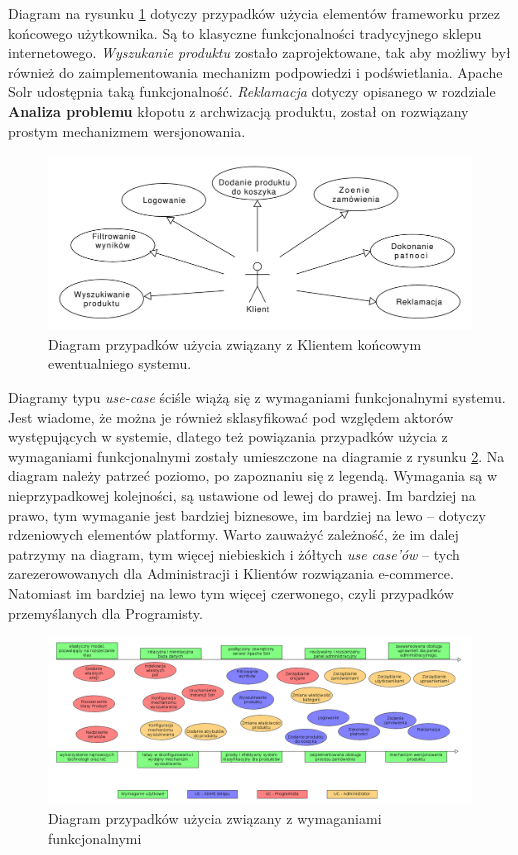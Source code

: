 Diagram na rysunku \ref{useCaseCustomer} dotyczy przypadków użycia elementów frameworku przez końcowego użytkownika. Są to klasyczne funkcjonalności tradycyjnego sklepu internetowego. \textit{Wyszukanie produktu} zostało zaprojektowane, tak aby możliwy był również do zaimplementowania mechanizm podpowiedzi i podświetlania. Apache Solr udostępnia taką funkcjonalność. \textit{Reklamacja} dotyczy opisanego w rozdziale \textbf{Analiza problemu} kłopotu z archwizacją produktu, został on rozwiązany prostym mechanizmem wersjonowania. 
\begin{figure}
	\begin{center}
		\includegraphics[width=1\textwidth]{uccustomer.pdf}
	\end{center}
	\caption{{\color{black}Diagram przypadków użycia związany z Klientem końcowym ewentualniego systemu.}} \label{useCaseCustomer}
\end{figure}

Diagramy typu \textit{use-case} ściśle wiążą się z wymaganiami funkcjonalnymi systemu. Jest wiadome, że można je również sklasyfikować pod względem aktorów występujących w systemie, dlatego też powiązania przypadków użycia z wymaganiami funkcjonalnymi zostały umieszczone na diagramie z rysunku \ref{wymtoUC}. Na diagram należy patrzeć poziomo, po zapoznaniu się z legendą. Wymagania są w nieprzypadkowej kolejności, są ustawione od lewej do prawej. Im bardziej na prawo, tym wymaganie jest bardziej biznesowe, im bardziej na lewo -- dotyczy rdzeniowych elementów platformy. Warto zauważyć zależność, że im dalej patrzymy na diagram, tym więcej niebieskich i żółtych \textit{use case'ów} -- tych zarezerowowanych dla Administracji i Klientów rozwiązania e-commerce. Natomiast im bardziej na lewo tym więcej czerwonego, czyli przypadków przemyślanych dla Programisty.
\begin{figure}
	\begin{center}
		\includegraphics[angle=270,scale=0.4]{wymToUC.png}
	\end{center}
	\caption{{\color{black}Diagram przypadków użycia związany z wymaganiami funkcjonalnymi}} \label{wymtoUC}
\end{figure}

